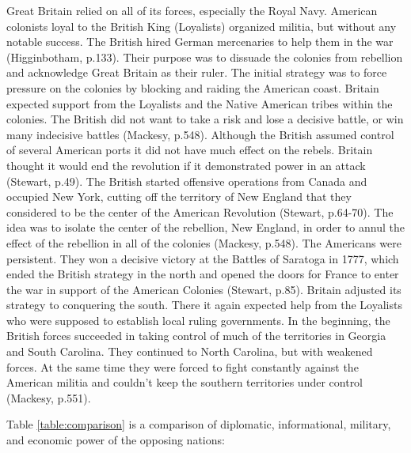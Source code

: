Great Britain relied on all of its forces, especially the Royal Navy.  American
colonists loyal to the British King (Loyalists) organized militia, but without
any notable success.  The British hired German mercenaries to help them in the
war (Higginbotham, p.133).  Their purpose was to dissuade the colonies from
rebellion and acknowledge Great Britain as their ruler.  The initial strategy
was to force pressure on the colonies by blocking and raiding the American
coast. Britain expected support from the Loyalists and the Native American
tribes within the colonies. The British did not want to take a risk and lose a
decisive battle, or win many indecisive battles (Mackesy, p.548).  Although the
British assumed control of several American ports it did not have much effect on
the rebels.  Britain thought it would end the revolution if it demonstrated
power in an attack (Stewart, p.49).  The British started offensive operations
from Canada and occupied New York, cutting off the territory of New England that
they considered to be the center of the American Revolution (Stewart, p.64-70).
The idea was to isolate the center of the rebellion, New England, in order to
annul the effect of the rebellion in all of the colonies (Mackesy, p.548).  The
Americans were persistent.  They won a decisive victory at the Battles of
Saratoga in 1777, which ended the British strategy in the north and opened the
doors for France to enter the war in support of the American Colonies (Stewart,
p.85).  Britain adjusted its strategy to conquering the south.  There it again
expected help from the Loyalists who were supposed to establish local ruling
governments.  In the beginning, the British forces succeeded in taking control
of much of the territories in Georgia and South Carolina.  They continued to
North Carolina, but with weakened forces.  At the same time they were forced to
fight constantly against the American militia and couldn’t keep the southern
territories under control (Mackesy, p.551).

Table \ref{table:comparison} is a comparison of diplomatic, informational, military,
    and economic power of the opposing nations:





